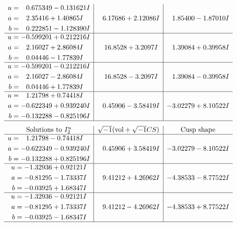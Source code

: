 \documentclass[1p]{elsarticle_modified}
\theoremstyle{definition}
\newcommand{\I}{\sqrt{-1}}
\begin{document}
$$\begin{array}{c|c|c}
\begin{aligned}
u &= \phantom{-}0.675349 - 0.131621 I \\
a &= \phantom{-}2.35416 + 1.40865 I \\
b &= \phantom{-}0.222851 - 1.128390 I\end{aligned}
 & \phantom{-}6.17686 + 2.12086 I & \phantom{-}1.85400 - 1.87010 I \\ \hline\begin{aligned}
u &= -0.599201 + 0.212216 I \\
a &= \phantom{-}2.16027 + 2.86084 I \\
b &= \phantom{-}0.04446 - 1.77839 I\end{aligned}
 & \phantom{-}16.8528 + 3.2097 I & \phantom{-}1.39084 + 0.39958 I \\ \hline\begin{aligned}
u &= -0.599201 - 0.212216 I \\
a &= \phantom{-}2.16027 - 2.86084 I \\
b &= \phantom{-}0.04446 + 1.77839 I\end{aligned}
 & \phantom{-}16.8528 - 3.2097 I & \phantom{-}1.39084 - 0.39958 I \\ \hline\begin{aligned}
u &= \phantom{-}1.21798 + 0.74418 I \\
a &= -0.622349 + 0.939240 I \\
b &= -0.132288 - 0.825196 I\end{aligned}
 & \phantom{-}0.45906 - 3.58419 I & -3.02279 + 8.10522 I\\
 \hline 
 \end{array}$$\newpage$$\begin{array}{c|c|c}  
\text{Solutions to }I^u_{2}& \I (\text{vol} + \sqrt{-1}CS) & \text{Cusp shape}\\
 \hline 
\begin{aligned}
u &= \phantom{-}1.21798 - 0.74418 I \\
a &= -0.622349 - 0.939240 I \\
b &= -0.132288 + 0.825196 I\end{aligned}
 & \phantom{-}0.45906 + 3.58419 I & -3.02279 - 8.10522 I \\ \hline\begin{aligned}
u &= -1.32936 + 0.92121 I \\
a &= -0.81295 - 1.73337 I \\
b &= -0.03925 + 1.68347 I\end{aligned}
 & \phantom{-}9.41212 + 4.26962 I & -4.38533 - 8.77522 I \\ \hline\begin{aligned}
u &= -1.32936 - 0.92121 I \\
a &= -0.81295 + 1.73337 I \\
b &= -0.03925 - 1.68347 I\end{aligned}
 & \phantom{-}9.41212 - 4.26962 I & -4.38533 + 8.77522 I\\
 \hline 
 \end{array}$$\newpage
\end{document}
